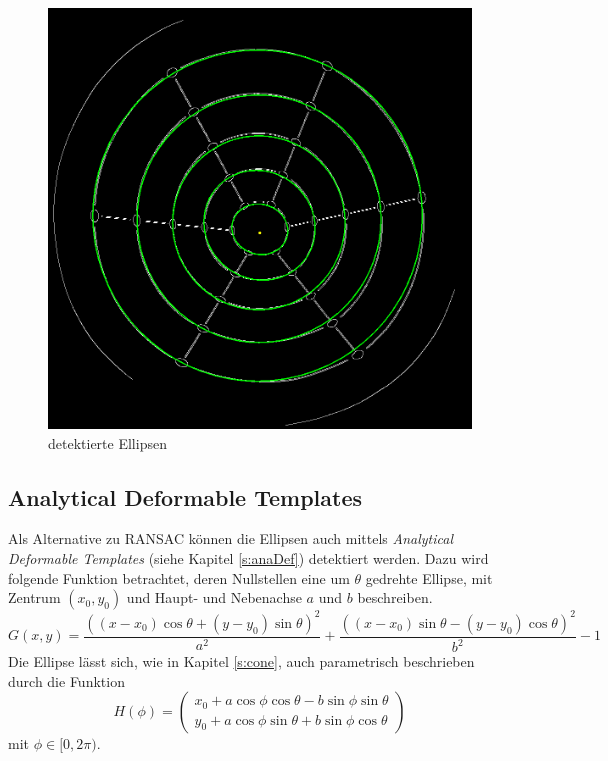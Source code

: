 \begin{figure}[!htb]
	\centering
	\includegraphics[scale=.25]{images/detectedEllipses.png}
	\caption{detektierte Ellipsen}
	\label{fig:detectedEllipses}
\end{figure}


\subsection{Analytical Deformable Templates}

Als Alternative zu RANSAC können die Ellipsen auch mittels \textit{Analytical Deformable Templates} (siehe Kapitel \ref{s:anaDef}) detektiert werden. Dazu wird folgende Funktion betrachtet, deren Nullstellen eine um $\theta$ gedrehte Ellipse, mit Zentrum $(x_0,y_0)$ und Haupt- und Nebenachse $a$ und $b$ beschreiben.
\[
	G(x,y) = \frac{((x - x_0)\cos\theta + (y - y_0)\sin\theta)^2}{a^2} + \frac{((x - x_0)\sin\theta - (y - y_0)\cos\theta)^2}{b^2} - 1
\] %
Die Ellipse lässt sich, wie in Kapitel \ref{s:cone}, auch parametrisch beschrieben durch die Funktion
\[
H(\phi) = \begin{pmatrix}x_0 + a\cos\phi\cos\theta - b\sin\phi\sin\theta \\
y_0 + a\cos\phi\sin\theta + b\sin\phi\cos\theta\end{pmatrix}
\] %
mit $\phi \in [0,2\pi)$.

